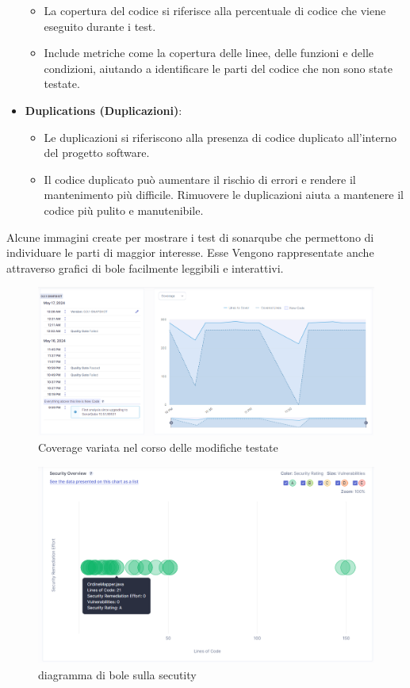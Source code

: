\begin{itemize}
\begin{itemize}
        \item La copertura del codice si riferisce alla percentuale di codice che viene eseguito durante i test.
        \item Include metriche come la copertura delle linee, delle funzioni e delle condizioni, aiutando a identificare le parti del codice che non sono state testate.
    \end{itemize}
    \item \textbf{Duplications (Duplicazioni)}:
    \begin{itemize}
        \item Le duplicazioni si riferiscono alla presenza di codice duplicato all'interno del progetto software.
        \item Il codice duplicato può aumentare il rischio di errori e rendere il mantenimento più difficile. Rimuovere le duplicazioni aiuta a mantenere il codice più pulito e manutenibile.
    \end{itemize}
\end{itemize}

\newpage
Alcune immagini create per mostrare i test di sonarqube che permettono di individuare le parti di maggior interesse.
Esse Vengono rappresentate anche attraverso grafici di bole facilmente leggibili e interattivi.

\begin{figure}[htbp]
	\centering
	\includegraphics[scale=0.30]{iterazione1/images/coverage_percent_modifier.png}
	\caption{Coverage variata nel corso delle modifiche testate\label{fig:coverage percent modifier}}
\end{figure}

\begin{figure}[htbp]
	\centering
	\includegraphics[scale=0.50]{iterazione1/images/secutiry.png}
	\caption{diagramma di bole sulla secutity\label{fig:security}}
\end{figure}

